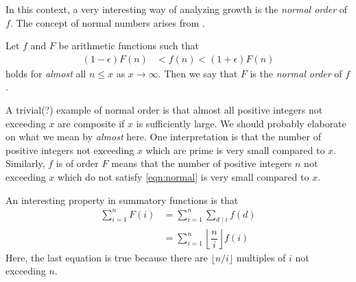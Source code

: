 \documentclass[elemannt.tex]{subfile}
\begin{document}
	In this context, a very interesting way of analyzing growth is the \textit{normal order} of $f$. The concept of normal numbers arises from \textcite{hardy_aiyangar_1917}.
		\begin{definition}
			Let $f$ and $F$ be arithmetic functions such that
				\begin{align}
					(1-\epsilon)F(n) 
						& < f(n)<(1+\epsilon)F(n)\label{eqn:normal}
				\end{align}
			holds for \textit{almost} all $n\leq x$ as $x\to\infty$. Then we say that $F$ is the \textit{normal order} of $f$.
		\end{definition}
	A trivial(?) example of normal order is that almost all positive integers not exceeding $x$ are composite if $x$ is sufficiently large. We should probably elaborate on what we mean by \textit{almost} here. One interpretation is that the number of positive integers not exceeding $x$ which are prime is very small compared to $x$. Similarly, $f$ is of order $F$ means that the number of positive integers $n$ not exceeding $x$ which do not satisfy \ref{eqn:normal} is very small compared to $x$.
	
	An interesting property in summatory functions is that
		\begin{align*}
			\sum_{i=1}^{n}F(i)
				& = \sum_{i=1}^{n}\sum_{d\mid i}f(d)\\
				& = \sum_{i=1}^{n}\left\lfloor{\dfrac{n}{i}}\right\rfloor f(i)
		\end{align*}
	Here, the last equation is true because there are $\lfloor{n/i}\rfloor$ multiples of $i$ not exceeding $n$.
\end{document}
